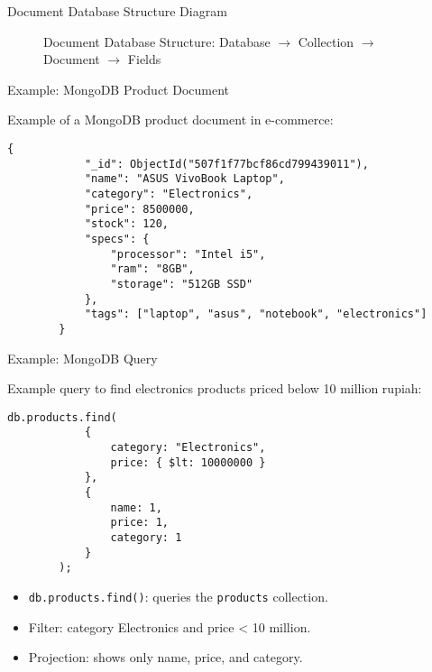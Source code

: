 \documentclass[aspectratio=169, table]{beamer}
\begin{document}
\begin{frame}{Document Database Structure Diagram}
	\vspace{20pt}
	
	\begin{figure}
		\centering
		\caption{Document Database Structure: Database $\rightarrow$ Collection $\rightarrow$ Document $\rightarrow$ Fields}
	\end{figure}
	
\end{frame}

\begin{frame}[fragile]{Example: MongoDB Product Document}
	\vspace{20pt}
	
	Example of a MongoDB product document in e-commerce:
	
	\begin{lstlisting}[style=JavaScript, basicstyle=\ttfamily\scriptsize]
		{
			"_id": ObjectId("507f1f77bcf86cd799439011"),
			"name": "ASUS VivoBook Laptop",
			"category": "Electronics",
			"price": 8500000,
			"stock": 120,
			"specs": {
				"processor": "Intel i5",
				"ram": "8GB",
				"storage": "512GB SSD"
			},
			"tags": ["laptop", "asus", "notebook", "electronics"]
		}
	\end{lstlisting}
	
\end{frame}

\begin{frame}[fragile]{Example: MongoDB Query}
	\vspace{20pt}
	
	Example query to find electronics products priced below 10 million rupiah:
	
	\begin{lstlisting}[style=JavaScript, basicstyle=\ttfamily\scriptsize]
		db.products.find(
			{ 
				category: "Electronics", 
				price: { $lt: 10000000 } 
			},
			{
				name: 1,
				price: 1,
				category: 1
			}
		);
	\end{lstlisting}
	
	\begin{itemize}
		\item \texttt{db.products.find()}: queries the \texttt{products} collection.
		\item Filter: category Electronics and price < 10 million.
		\item Projection: shows only name, price, and category.
	\end{itemize}
	
\end{frame}
\end{document}

